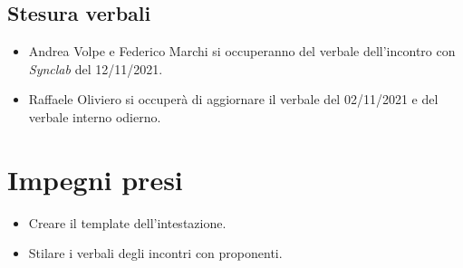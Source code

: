 \documentclass[a4paper,12pt]{article}
\begin{document}
\subsection{Stesura verbali}
\begin{itemize}
    \item Andrea Volpe e Federico Marchi si occuperanno del verbale dell'incontro con \textit{Synclab} del 12/11/2021.
    \item Raffaele Oliviero si occuperà di aggiornare il verbale del 02/11/2021 e del verbale interno odierno.
\end{itemize}

\section{Impegni presi}
\begin{itemize}
\item Creare il template dell'intestazione.
\item Stilare i verbali degli incontri con proponenti.
\end{itemize}
\end{document}
